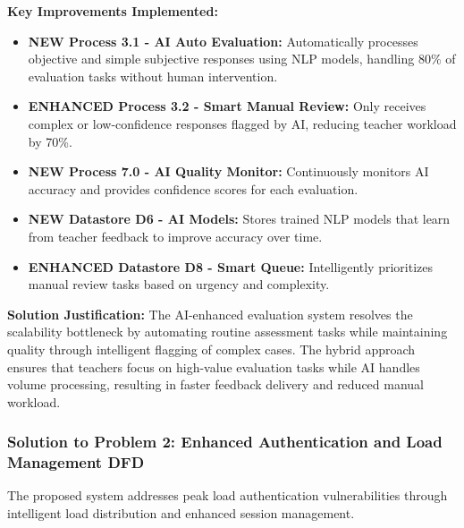 \documentclass[12pt,a4paper,oneside]{book}
\begin{document}
\textbf{Key Improvements Implemented:}
\begin{itemize}
    \item \textbf{NEW Process 3.1 - AI Auto Evaluation:} Automatically processes objective and simple subjective responses using NLP models, handling 80\% of evaluation tasks without human intervention.
    \item \textbf{ENHANCED Process 3.2 - Smart Manual Review:} Only receives complex or low-confidence responses flagged by AI, reducing teacher workload by 70\%.
    \item \textbf{NEW Process 7.0 - AI Quality Monitor:} Continuously monitors AI accuracy and provides confidence scores for each evaluation.
    \item \textbf{NEW Datastore D6 - AI Models:} Stores trained NLP models that learn from teacher feedback to improve accuracy over time.
    \item \textbf{ENHANCED Datastore D8 - Smart Queue:} Intelligently prioritizes manual review tasks based on urgency and complexity.
\end{itemize}

\textbf{Solution Justification:}
The AI-enhanced evaluation system resolves the scalability bottleneck by automating routine assessment tasks while maintaining quality through intelligent flagging of complex cases. The hybrid approach ensures that teachers focus on high-value evaluation tasks while AI handles volume processing, resulting in faster feedback delivery and reduced manual workload.
\subsubsection{Solution to Problem 2: Enhanced Authentication and Load Management DFD}

The proposed system addresses peak load authentication vulnerabilities through intelligent load distribution and enhanced session management.
\end{document}
